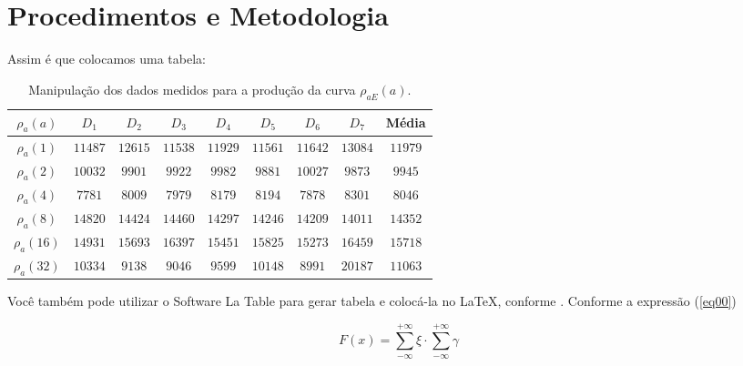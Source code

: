 

\chapter{Procedimentos e Metodologia}
\label{cap:metodologia}

Assim é que colocamos uma tabela:

\begin{table}[h!]
\renewcommand{\arraystretch}{1.3}
\caption{Manipulação dos dados medidos para a produção da curva $\rho_{aE}(a)$.}
\centering
\begin{tabular}{c||c||c||c||c||c||c||c||c}\hline
\bfseries $\rho_a(a)$ & \bfseries $D_1$ & \bfseries $D_2$ & \bfseries $D_3$ & \bfseries $D_4$ & \bfseries $D_5$ & \bfseries $D_6$ & \bfseries $D_7$ & \bfseries Média \\\hline\hline
$\rho_a(1)$  & $11487$ & $12615$ & $11538$ & $11929$ & $11561$ & $11642$ & $13084$ & $11979$\\
$\rho_a(2)$  & $10032$ & $9901$  & $9922$  & $9982$  & $9881$  & $10027$ & $9873$  & $9945$ \\
$\rho_a(4)$  & $7781$  & $8009$  & $7979$  & $8179$  & $8194$  & $7878$  & $8301$  & $8046$ \\
$\rho_a(8)$  & $14820$ & $14424$ & $14460$ & $14297$ & $14246$ & $14209$ & $14011$ & $14352$\\
$\rho_a(16)$ & $14931$ & $15693$ & $16397$ & $15451$ & $15825$ & $15273$ & $16459$ & $15718$\\
$\rho_a(32)$ & $10334$ & $9138$  & $9046$  & $9599$  & $10148$ & $8991$  & $20187$ & $11063$\\\hline
\end{tabular}
\label{tab41new}
\end{table}

Você também pode utilizar o Software La Table para gerar tabela e colocá-la no \LaTeX, conforme \cite{bb20}. Conforme a expressão (\ref{eq00})

\begin{equation}
 F(x) = \sum_{-\infty}^{+\infty} \xi \cdot \sum_{-\infty}^{+\infty} \gamma
 \label{eq00}
\end{equation}



